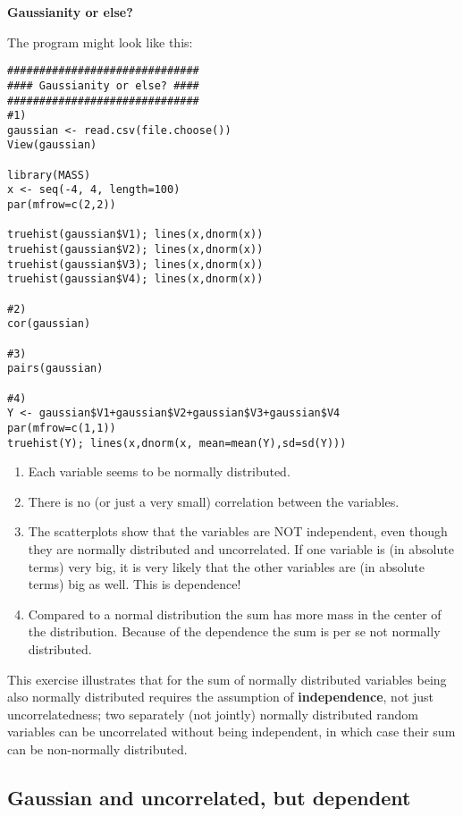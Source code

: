 \documentclass{article}
\begin{document}
\begin{solution}
\textbf{Gaussianity or else?}

The program might look like this:
\begin{verbatim}
##############################
#### Gaussianity or else? ####
##############################
#1)
gaussian <- read.csv(file.choose())
View(gaussian)

library(MASS)
x <- seq(-4, 4, length=100)
par(mfrow=c(2,2))

truehist(gaussian$V1); lines(x,dnorm(x))
truehist(gaussian$V2); lines(x,dnorm(x))
truehist(gaussian$V3); lines(x,dnorm(x))
truehist(gaussian$V4); lines(x,dnorm(x))

#2)
cor(gaussian)

#3)
pairs(gaussian)

#4)
Y <- gaussian$V1+gaussian$V2+gaussian$V3+gaussian$V4
par(mfrow=c(1,1))
truehist(Y); lines(x,dnorm(x, mean=mean(Y),sd=sd(Y)))
\end{verbatim}
\begin{enumerate}
  \item Each variable seems to be normally distributed.
  \item There is no (or just a very small) correlation between the
      variables.
  \item The scatterplots show that the variables are NOT independent,
      even though they are normally distributed and uncorrelated. If one
      variable is (in absolute terms) very big, it is very likely that
      the other variables are (in absolute terms) big as well. This is
      dependence!
  \item Compared to a normal distribution the sum has more mass in the
      center of the distribution. Because of the dependence the sum is
      per se not normally distributed.
\end{enumerate}
This exercise illustrates that for the sum of normally distributed variables
being also normally distributed requires the assumption of
\textbf{independence}, not just uncorrelatedness; two separately (not
jointly) normally distributed random variables can be uncorrelated without
being independent, in which case their sum can be non-normally distributed.
\end{solution}

\subsection{Gaussian and uncorrelated, but dependent}
\end{document}
